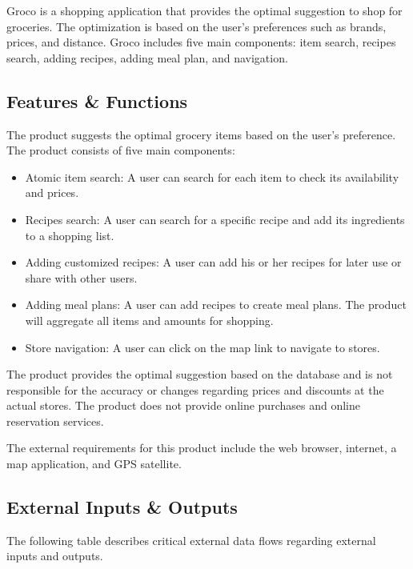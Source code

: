 Groco is a shopping application that provides the optimal suggestion to shop for groceries. The optimization is based on the user's preferences such as brands, prices, and distance. Groco includes five main components: item search, recipes search, adding recipes, adding meal plan, and navigation.

\subsection{Features \& Functions}
The product suggests the optimal grocery items based on the user's preference. The product consists of five main components:
\begin{itemize}
    \item Atomic item search: A user can search for each item to check its availability and prices.
    \item Recipes search: A user can search for a specific recipe and add its ingredients to a shopping list.
    \item Adding customized recipes: A user can add his or her recipes for later use or share with other users.
    \item Adding meal plans: A user can add recipes to create meal plans. The product will aggregate all items and amounts for shopping.
    \item Store navigation: A user can click on the map link to navigate to stores.
\end{itemize}
The product provides the optimal suggestion based on the database and is not responsible for the accuracy or changes regarding prices and discounts at the actual stores. The product does not provide online purchases and online reservation services.

The external requirements for this product include the web browser, internet, a map application, and GPS satellite.

\subsection{External Inputs \& Outputs}
The following table describes critical external data flows regarding external inputs and outputs.

